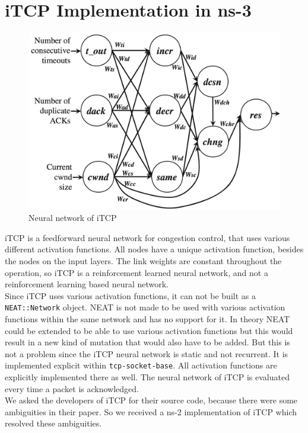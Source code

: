 \section{iTCP Implementation in ns-3}\label{sec:itcpimpl}
\begin{figure}[h]
	\centering
	\includegraphics[width=1\linewidth]{itcp}
	\caption{Neural network of iTCP \cite{iTCP}}
	\label{fig:itcp}
\end{figure}
iTCP is a feedforward neural network for congestion control, that uses various different activation functions. 
All nodes have a unique activation function, besides the nodes on the input layers. 
The link weights are constant throughout the operation, so iTCP is a reinforcement learned neural network, and not a reinforcement learning based neural network.
\\Since iTCP uses various activation functions, it can not be built as a \texttt{NEAT::Network} object. 
NEAT is not made to be used with various activation functions within the same network and has no support for it. 
In theory NEAT could be extended to be able to use various activation functions but this would result in a new kind of mutation that would also have to be added. 
But this is not a problem since the iTCP neural network is static and not recurrent.
It is implemented explicit within \texttt{tcp-socket-base}.
 All activation functions are explicitly implemented there as well. 
The neural network of iTCP is evaluated every time a packet is acknowledged.\\ 
We asked the developers of iTCP for their source code, because there were some ambiguities in their paper. 
So we received a ns-2 implementation of iTCP which resolved these ambiguities. 
